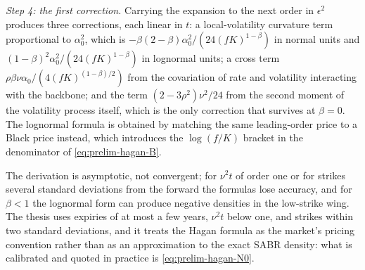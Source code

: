 \documentclass[../../main.tex]{subfiles}
\begin{document}
\emph{Step 4: the first correction.} Carrying the expansion to the next order in $\epsilon^2$ produces three corrections, each linear in $t$: a local-volatility curvature term proportional to $\alpha_0^2$, which is $-\beta(2-\beta)\alpha_0^2/(24(fK)^{1-\beta})$ in normal units and $(1-\beta)^2\alpha_0^2/(24(fK)^{1-\beta})$ in lognormal units; a cross term $\rho\beta\nu\alpha_0/(4(fK)^{(1-\beta)/2})$ from the covariation of rate and volatility interacting with the backbone; and the term $(2-3\rho^2)\nu^2/24$ from the second moment of the volatility process itself, which is the only correction that survives at $\beta=0$. The lognormal formula is obtained by matching the same leading-order price to a Black price instead, which introduces the $\log(f/K)$ bracket in the denominator of \eqref{eq:prelim-hagan-B}.

The derivation is asymptotic, not convergent; for $\nu^2t$ of order one or for strikes several standard deviations from the forward the formulas lose accuracy, and for $\beta<1$ the lognormal form can produce negative densities in the low-strike wing. The thesis uses expiries of at most a few years, $\nu^2t$ below one, and strikes within two standard deviations, and it treats the Hagan formula as the market's pricing convention rather than as an approximation to the exact SABR density: what is calibrated and quoted in practice is \eqref{eq:prelim-hagan-N0}.
\end{document}
